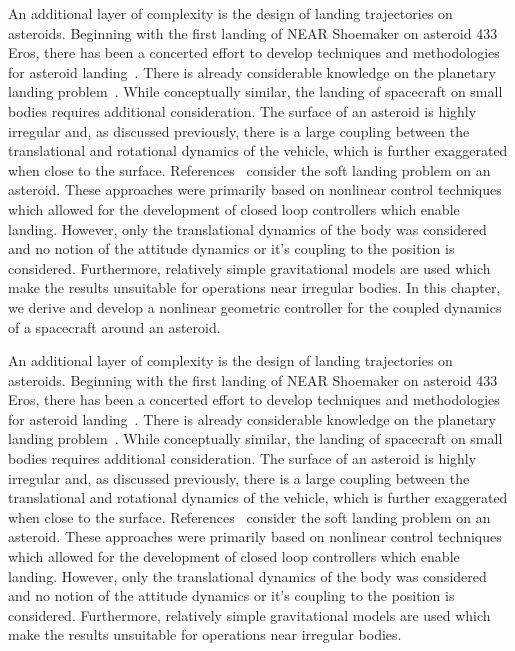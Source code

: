 An additional layer of complexity is the design of landing trajectories on asteroids.
Beginning with the first landing of NEAR Shoemaker on asteroid 433 Eros, there has been a concerted effort to develop techniques and methodologies for asteroid landing~\cite{dunham2002, kubota2006}.
There is already considerable knowledge on the planetary landing problem~\cite{acikmese2007, meditch1964, ingoldby1978}.
While conceptually similar, the landing of spacecraft on small bodies requires additional consideration. 
The surface of an asteroid is highly irregular and, as discussed previously, there is a large coupling between the translational and rotational dynamics of the vehicle, which is further exaggerated when close to the surface.
References~\cite{guelman1994, furfaro2013, zexu2012} consider the soft landing problem on an asteroid.
These approaches were primarily based on nonlinear control techniques which allowed for the development of closed loop controllers which enable landing.
However, only the translational dynamics of the body was considered and no notion of the attitude dynamics or it's coupling to the position is considered.
Furthermore, relatively simple gravitational models are used which make the results unsuitable for operations near irregular bodies.
In this chapter, we derive and develop a nonlinear geometric controller for the coupled dynamics of a spacecraft around an asteroid.

An additional layer of complexity is the design of landing trajectories on asteroids.
Beginning with the first landing of NEAR Shoemaker on asteroid 433 Eros, there has been a concerted effort to develop techniques and methodologies for asteroid landing~\cite{dunham2002, kubota2006}.
There is already considerable knowledge on the planetary landing problem~\cite{acikmese2007, meditch1964, ingoldby1978}.
While conceptually similar, the landing of spacecraft on small bodies requires additional consideration. 
The surface of an asteroid is highly irregular and, as discussed previously, there is a large coupling between the translational and rotational dynamics of the vehicle, which is further exaggerated when close to the surface.
References~\cite{guelman1994, furfaro2013, zexu2012} consider the soft landing problem on an asteroid.
These approaches were primarily based on nonlinear control techniques which allowed for the development of closed loop controllers which enable landing.
However, only the translational dynamics of the body was considered and no notion of the attitude dynamics or it's coupling to the position is considered.
Furthermore, relatively simple gravitational models are used which make the results unsuitable for operations near irregular bodies.
